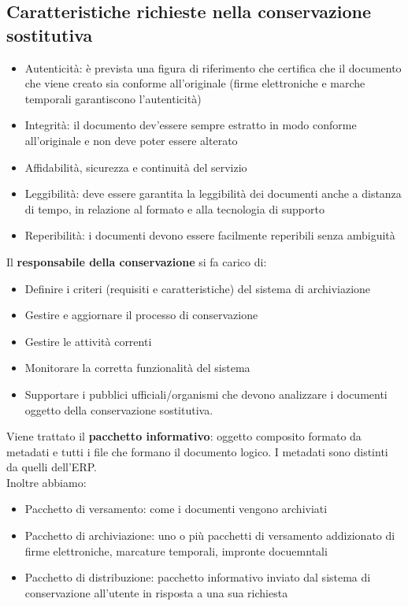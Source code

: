 \subsection{Caratteristiche richieste nella conservazione
	sostitutiva}

\begin{itemize}
	\item
	Autenticit\`a: \`e prevista una figura di riferimento che certifica che il
	documento che viene creato sia conforme all'originale (firme
	elettroniche e marche temporali garantiscono l'autenticit\`a)
	\item
	Integrit\`a: il documento dev'essere sempre estratto in modo conforme
	all'originale e non deve poter essere alterato
	\item
	Affidabilit\`a, sicurezza e continuit\`a del servizio
	\item
	Leggibilit\`a: deve essere garantita la leggibilit\`a dei documenti anche
	a distanza di tempo, in relazione al formato e alla tecnologia di supporto
	\item
	Reperibilit\`a: i documenti devono essere facilmente reperibili senza 
	ambiguit\`a
	
\end{itemize}

Il \textbf{responsabile della conservazione} si fa carico di:

\begin{itemize}
	\item 
	Definire i criteri (requisiti e caratteristiche) del sistema di 
	archiviazione
	\item
	Gestire e aggiornare il processo di conservazione
	\item 
	Gestire le attivit\`a correnti
	\item 
	Monitorare la corretta funzionalit\`a del sistema
	\item 
	Supportare i pubblici ufficiali/organismi che devono analizzare i
	documenti oggetto della conservazione sostitutiva.
\end{itemize}

Viene trattato il \textbf{pacchetto informativo}: oggetto composito formato da 
metadati e tutti i file che formano il documento logico. 
I metadati sono distinti da quelli dell'ERP.\\

Inoltre abbiamo:
\begin{itemize}
	\item
	Pacchetto di versamento: come i documenti vengono archiviati
	\item
	Pacchetto di archiviazione: uno o pi\`u pacchetti di versamento addizionato
	di firme elettroniche, marcature temporali, impronte docuemntali
	\item
	Pacchetto di distribuzione: pacchetto informativo inviato dal sistema
	di conservazione all'utente in risposta a una sua richiesta
\end{itemize}

